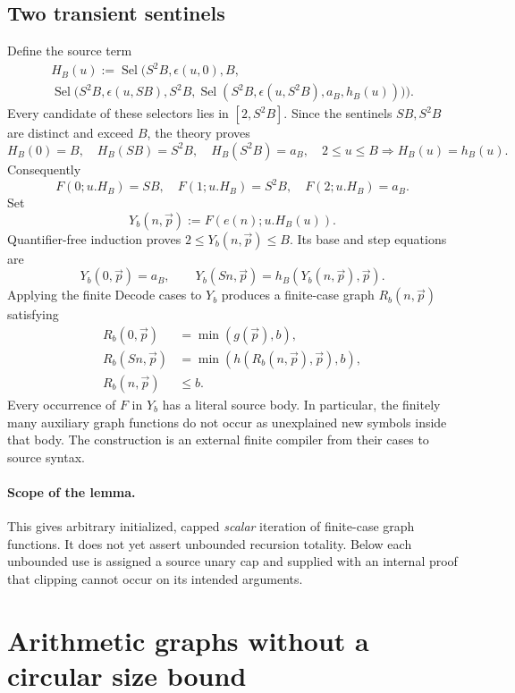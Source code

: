 \documentclass[11pt,letterpaper]{article}
\theoremstyle{definition}\newtheorem{definition}[theorem]{Definition}
\theoremstyle{remark}\newtheorem{remark}[theorem]{Remark}
\begin{document}
\subsection{Two transient sentinels}
Define the source term
\[
\begin{split}
 H_B(u):=\operatorname{Sel}\bigl(S^2B,\epsilon(u,0),B,\quad\qquad\qquad\qquad\qquad\qquad\\
 \operatorname{Sel}\bigl(S^2B,\epsilon(u,SB),S^2B,
 \operatorname{Sel}(S^2B,\epsilon(u,S^2B),a_B,h_B(u))\bigr)\bigr).
\end{split}
\]
Every candidate of these selectors lies in $[2,S^2B]$. Since the
sentinels $SB,S^2B$ are distinct and exceed $B$, the theory proves
\[
 H_B(0)=B,\quad H_B(SB)=S^2B,\quad H_B(S^2B)=a_B,
 \quad 2\le u\le B\Longrightarrow H_B(u)=h_B(u).
\]
Consequently
\[
 F(0;u.H_B)=SB,\quad F(1;u.H_B)=S^2B,\quad F(2;u.H_B)=a_B.
\]
Set
\[
                      Y_b(n,\vec p):=F(e(n);u.H_B(u)).
\]
Quantifier-free induction proves $2\le Y_b(n,\vec p)\le B$.
Its base and step equations are
\[
 Y_b(0,\vec p)=a_B,\qquad
 Y_b(Sn,\vec p)=h_B(Y_b(n,\vec p),\vec p).
\]
Applying the finite Decode cases to $Y_b$ produces a finite-case
graph $R_b(n,\vec p)$ satisfying
\[
\begin{split}
 R_b(0,\vec p)&=\min(g(\vec p),b),\\
 R_b(Sn,\vec p)&=\min(h(R_b(n,\vec p),\vec p),b),\\
 R_b(n,\vec p)&\le b.
\end{split}
\tag{Bounded iteration}
\]
Every occurrence of $F$ in $Y_b$ has a literal source body. In
particular, the finitely many auxiliary graph functions do not occur
as unexplained new symbols inside that body. The construction is an
external finite compiler from their cases to source syntax.

\paragraph{Scope of the lemma.}
This gives arbitrary initialized, capped \emph{scalar} iteration of
finite-case graph functions. It does not yet assert unbounded
recursion totality. Below each unbounded use is assigned a source
unary cap and supplied with an internal proof that clipping cannot
occur on its intended arguments.

\section{Arithmetic graphs without a circular size bound}
\label{sec:selfseed-arithmetic}
\end{document}
